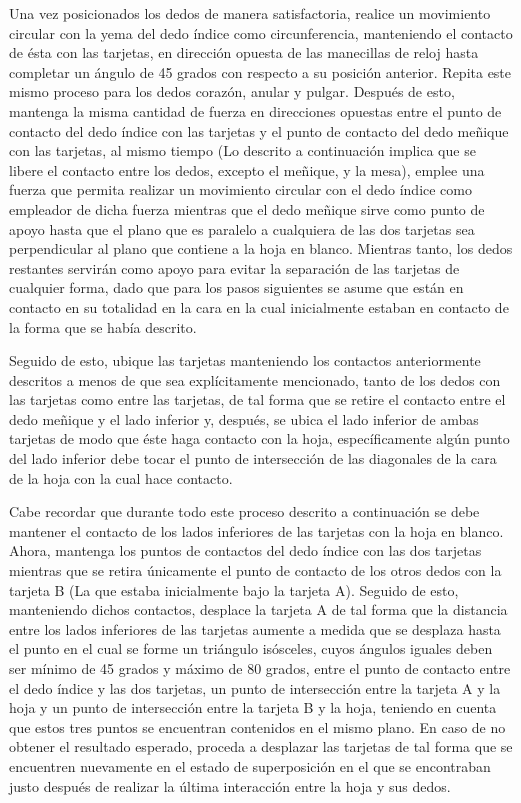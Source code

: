 \documentclass{article}
\begin{document}
Una vez posicionados los dedos de manera satisfactoria, realice un movimiento circular con la yema del dedo índice como circunferencia, manteniendo el contacto de ésta con las tarjetas, en dirección opuesta de las manecillas de reloj hasta completar un ángulo de 45 grados con respecto a su posición anterior. Repita este mismo proceso para los dedos corazón, anular y pulgar. Después de esto, mantenga la misma cantidad de fuerza en direcciones opuestas entre el punto de contacto del dedo índice con las tarjetas y el punto de contacto del dedo meñique con las tarjetas, al mismo tiempo (Lo descrito a continuación implica que se libere el contacto entre los dedos, excepto el meñique, y la mesa), emplee una fuerza que permita realizar un movimiento circular con el dedo índice como empleador de dicha fuerza mientras que el dedo meñique sirve como punto de apoyo hasta que el plano que es paralelo a cualquiera de las dos tarjetas sea perpendicular al plano que contiene a la hoja en blanco. Mientras tanto, los dedos restantes servirán como apoyo para evitar la separación de las tarjetas de cualquier forma, dado que para los pasos siguientes se asume que están en contacto en su totalidad en la cara en la cual inicialmente estaban en contacto de la forma que se había descrito.

Seguido de esto, ubique las tarjetas manteniendo los contactos anteriormente descritos a menos de que sea explícitamente mencionado, tanto de los dedos con las tarjetas como entre las tarjetas, de tal forma que se retire el contacto entre el dedo meñique y el lado inferior y, después, se ubica el lado inferior de ambas tarjetas de modo que éste haga contacto con la hoja, específicamente algún punto del lado inferior debe tocar el punto de intersección de las diagonales de la cara de la hoja con la cual hace contacto.

Cabe recordar que durante todo este proceso descrito a continuación se debe mantener el contacto de los lados inferiores de las tarjetas con la hoja en blanco. Ahora, mantenga los puntos de contactos del dedo índice con las dos tarjetas mientras que se retira únicamente el punto de contacto de los otros dedos con la tarjeta B (La que estaba inicialmente bajo la tarjeta A). Seguido de esto, manteniendo dichos contactos, desplace la tarjeta A de tal forma que la distancia entre los lados inferiores de las tarjetas aumente a medida que se desplaza hasta el punto en el cual se forme un triángulo isósceles, cuyos ángulos iguales deben ser mínimo de 45 grados y máximo de 80 grados, entre el punto de contacto entre el dedo índice y las dos tarjetas, un punto de intersección entre la tarjeta A y la hoja y un punto de intersección entre la tarjeta B y la hoja, teniendo en cuenta que estos tres puntos se encuentran contenidos en el mismo plano. En caso de no obtener el resultado esperado, proceda a desplazar las tarjetas de tal forma que se encuentren nuevamente en el estado de superposición en el que se encontraban justo después de realizar la última interacción entre la hoja y sus dedos.
\end{document}
